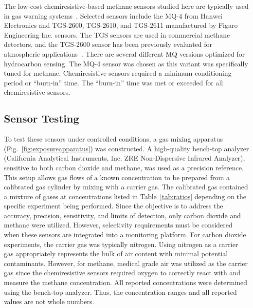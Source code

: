 \documentclass[times]{joehreview}
\begin{document}
	The low-cost chemiresistive-based methane sensors studied here are typically used in gas warning systems~\cite{chiu_towards_2013}.  Selected sensors include the MQ-4 from Hanwei Electronics and TGS-2600, TGS-2610, and TGS-2611 manufactured by Figaro Engineering Inc. sensors.  The TGS sensors are used in commercial methane detectors, and the TGS-2600 sensor has been previously evaluated for atmospheric applications~\cite{eugster_performance_2012,bossche_potential_2017}.  There are several different MQ versions optimized for hydrocarbon sensing.  The MQ-4 sensor was chosen as this variant was specifically tuned for methane.  Chemiresistive sensors required a minimum conditioning period or ``burn-in'' time.  The ``burn-in'' time was met or exceeded for all chemiresistive sensors.  
	
	\subsection{Sensor Testing }
	To test these sensors under controlled conditions, a gas mixing apparatus (Fig.~\ref{fig:exposureapparatus}) was constructed.  A high-quality bench-top analyzer (California Analytical Instruments, Inc. ZRE Non-Dispersive Infrared Analyzer), sensitive to both carbon dioxide and methane, was used as a precision reference. This setup allows gas flows of a known concentration to be prepared from a calibrated gas cylinder by mixing with a carrier gas.  The calibrated gas contained a mixture of gases at concentrations listed in Table~\ref{tab:ratios} depending on the specific experiment being performed.  Since the objective is to address the accuracy, precision, sensitivity, and limits of detection, only carbon dioxide and methane were utilized.  However, selectivity requirements must be considered when these sensors are integrated into a monitoring platform.  For carbon dioxide experiments, the carrier gas was typically nitrogen.  Using nitrogen as a carrier gas appropriately represents the bulk of air content with minimal potential contaminants.  However, for methane, medical grade air was utilized as the carrier gas since the chemiresistive sensors required oxygen to correctly react with and measure the methane concentration.  All reported concentrations were determined using the bench-top analyzer.  Thus, the concentration ranges and all reported values are not whole numbers.	  
	
\end{document}
